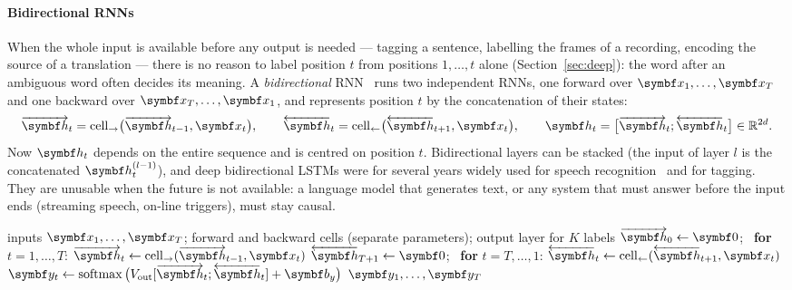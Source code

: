 \documentclass[11pt]{article}
\newcommand{\hv}{\vect{h}}
\newcommand{\bv}{\vect{b}}
\newcommand{\yv}{\vect{y}}
\newcommand{\softmax}{\operatorname{softmax}}
\begin{document}
\paragraph{Bidirectional RNNs} When the whole input is available before any output is needed --- tagging a sentence,
labelling the frames of a recording, encoding the source of a translation --- there is no reason to label position $t$
from positions $1, \dots, t$ alone (Section~\ref{sec:deep}): the word after an ambiguous word often decides its
meaning. A \emph{bidirectional} RNN~\cite{schuster1997} runs two independent RNNs, one forward over $\x_1, \dots, \x_T$ and one
backward over $\x_T, \dots, \x_1$, and represents position $t$ by the concatenation of their states:
\begin{equation}\label{eq:birnn}
  \overrightarrow{\hv}_t = \mathrm{cell}_{\rightarrow}\big(\overrightarrow{\hv}_{t-1}, \x_t\big), \qquad
  \overleftarrow{\hv}_t = \mathrm{cell}_{\leftarrow}\big(\overleftarrow{\hv}_{t+1}, \x_t\big), \qquad
  \hv_t = \big[\overrightarrow{\hv}_t; \overleftarrow{\hv}_t\big] \in \R^{2d} .
\end{equation}
Now $\hv_t$ depends on the entire sequence and is centred on position $t$. Bidirectional layers can be stacked (the input of
layer $l$ is the concatenated $\hv^{(l-1)}_t$), and deep bidirectional LSTMs were for several years widely used for
speech recognition~\cite{graves2013speech} and for tagging. They are unusable when the future is not available: a
language model that generates text, or any system that must answer before the input ends (streaming speech, on-line
triggers), must stay causal.

\begin{algorithm}[htbp]
\caption{A bidirectional RNN tagger: forward pass}\label{alg:birnn}
\begin{algorithmic}[1]
\Require inputs $\x_1, \dots, \x_T$; forward and backward cells (separate parameters); output layer for $K$ labels
  \State $\overrightarrow{\hv}_0 \gets \vect{0}$; \ \textbf{for} $t = 1, \dots, T$: $\overrightarrow{\hv}_t \gets \mathrm{cell}_{\rightarrow}(\overrightarrow{\hv}_{t-1}, \x_t)$
  \State $\overleftarrow{\hv}_{T+1} \gets \vect{0}$; \ \textbf{for} $t = T, \dots, 1$: $\overleftarrow{\hv}_t \gets \mathrm{cell}_{\leftarrow}(\overleftarrow{\hv}_{t+1}, \x_t)$
    \State $\yv_t \gets \softmax\big(V_{\mathrm{out}}[\overrightarrow{\hv}_t; \overleftarrow{\hv}_t] + \bv_y\big)$ 
  \EndFor
  \State \Return $\yv_1, \dots, \yv_T$ 
\EndFunction
\end{algorithmic}
\end{algorithm}
\end{document}
